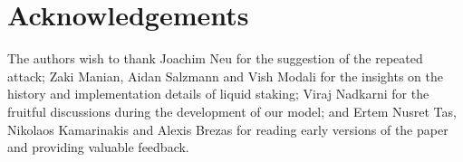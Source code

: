 \section{Acknowledgements}

The authors wish to thank Joachim Neu for the suggestion of the repeated attack;
Zaki Manian, Aidan Salzmann and Vish Modali for the insights on the history and
implementation details of liquid staking;
Viraj Nadkarni for the fruitful discussions during the
development of our model; and Ertem Nusret Tas, Nikolaos Kamarinakis and
Alexis Brezas for reading early versions of the paper
and providing valuable feedback.